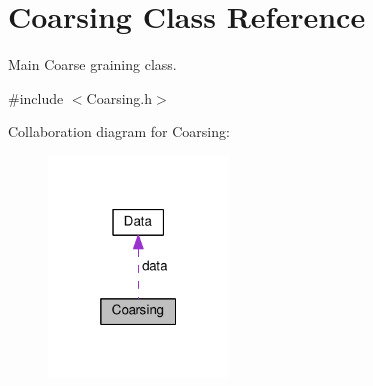 \hypertarget{classCoarsing}{}\section{Coarsing Class Reference}
\label{classCoarsing}


Main Coarse graining class.  




{\ttfamily \#include $<$Coarsing.\+h$>$}



Collaboration diagram for Coarsing\+:\nopagebreak
\begin{figure}[H]
\begin{center}
\leavevmode
\includegraphics[width=136pt]{classCoarsing__coll__graph}
\end{center}
\end{figure}
